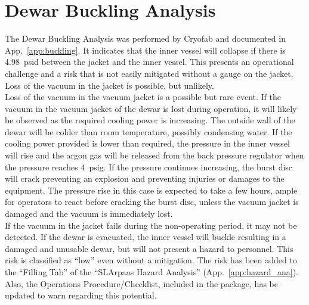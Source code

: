 \section{Dewar Buckling Analysis}
\label{sec:buckling}

The Dewar Buckling Analysis was performed by Cryofab and documented in 
App.~\ref{app:buckling}.
It indicates that the inner vessel will collapse if there is 4.98~psid between 
the jacket and the inner vessel. 
This presents an operational challenge and a risk that is not easily mitigated 
without a gauge on the jacket. 
Loss of the vacuum in the jacket is possible, but unlikely.\\

Loss of the vacuum in the vacuum jacket is a possible but rare event.
If the vacuum in the vacuum jacket of the dewar is lost during operation,
it will likely be observed as the required cooling power is increasing.
The outside wall of the dewar will be colder than room temperature,
possibly condensing water.
If the cooling power provided is lower than required,
the pressure in the inner vessel will rise and the argon gas will be released
from the back pressure regulator when the pressure reaches 4~psig.
If the pressure continues increasing, the burst disc will crack preventing
an explosion and preventing injuries or damages to the equipment.
The pressure rise in this case is expected to take a few hours,
ample for operators to react before cracking the burst disc,
unless the vacuum jacket is damaged and the vacuum is immediately lost.\\

If the vacuum in the jacket fails during the non-operating period,
it may not be detected.
If the dewar is evacuated, the inner vessel will buckle resulting in a damaged
and unusable dewar, but will not present a hazard to personnel.
This risk is classified as ``low'' even without a mitigation. 
The risk has been added to the ``Filling Tab'' of the ``SLArpaas Hazard Analysis''
(App.~\ref{app:hazard_ana}). 
Also, the Operations Procedure/Checklist, included in the package, has be updated to warn 
regarding this potential.